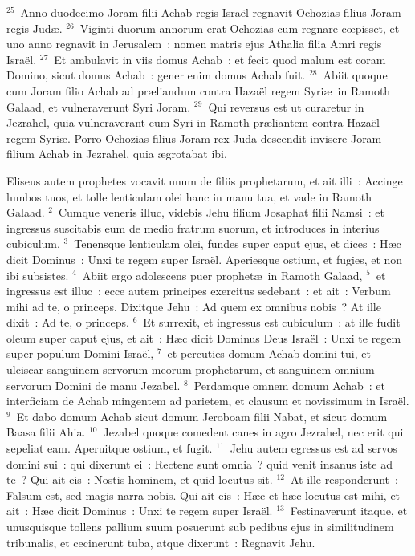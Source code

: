 ${}^{25}$~Anno duodecimo Joram filii Achab regis Isra\"el regnavit Ochozias filius Joram regis Jud\ae .
${}^{26}$~Viginti duorum annorum erat Ochozias cum regnare cœpisset, et uno anno regnavit in Jerusalem~: nomen matris ejus Athalia filia Amri regis Isra\"el.
${}^{27}$~Et ambulavit in viis domus Achab~: et fecit quod malum est coram Domino, sicut domus Achab~: gener enim domus Achab fuit.
${}^{28}$~Abiit quoque cum Joram filio Achab ad pr\ae liandum contra Haza\"el regem Syri\ae\ in Ramoth Galaad, et vulneraverunt Syri Joram.
${}^{29}$~Qui reversus est ut curaretur in Jezrahel, quia vulneraverant eum Syri in Ramoth pr\ae liantem contra Haza\"el regem Syri\ae . Porro Ochozias filius Joram rex Juda descendit invisere Joram filium Achab in Jezrahel, quia \ae grotabat ibi.

\bchapter
\lettrine[lines=3,image=true,loversize=0.05,lraise=-0.03]{E}{}liseus autem prophetes vocavit unum de filiis prophetarum, et ait illi~: Accinge lumbos tuos, et tolle lenticulam olei hanc in manu tua, et vade in Ramoth Galaad.
${}^{2}$~Cumque veneris illuc, videbis Jehu filium Josaphat filii Namsi~: et ingressus suscitabis eum de medio fratrum suorum, et introduces in interius cubiculum.
${}^{3}$~Tenensque lenticulam olei, fundes super caput ejus, et dices~: H\ae c dicit Dominus~: Unxi te regem super Isra\"el. Aperiesque ostium, et fugies, et non ibi subsistes.
${}^{4}$~Abiit ergo adolescens puer prophet\ae\ in Ramoth Galaad,
${}^{5}$~et ingressus est illuc~: ecce autem principes exercitus sedebant~: et ait~: Verbum mihi ad te, o princeps. Dixitque Jehu~: Ad quem ex omnibus nobis~? At ille dixit~: Ad te, o princeps.
${}^{6}$~Et surrexit, et ingressus est cubiculum~: at ille fudit oleum super caput ejus, et ait~: H\ae c dicit Dominus Deus Isra\"el~: Unxi te regem super populum Domini Isra\"el,
${}^{7}$~et percuties domum Achab domini tui, et ulciscar sanguinem servorum meorum prophetarum, et sanguinem omnium servorum Domini de manu Jezabel.
${}^{8}$~Perdamque omnem domum Achab~: et interficiam de Achab mingentem ad parietem, et clausum et novissimum in Isra\"el.
${}^{9}$~Et dabo domum Achab sicut domum Jeroboam filii Nabat, et sicut domum Baasa filii Ahia.
${}^{10}$~Jezabel quoque comedent canes in agro Jezrahel, nec erit qui sepeliat eam. Aperuitque ostium, et fugit.
${}^{11}$~Jehu autem egressus est ad servos domini sui~: qui dixerunt ei~: Rectene sunt omnia~? quid venit insanus iste ad te~? Qui ait eis~: Nostis hominem, et quid locutus sit.
${}^{12}$~At ille responderunt~: Falsum est, sed magis narra nobis. Qui ait eis~: H\ae c et h\ae c locutus est mihi, et ait~: H\ae c dicit Dominus~: Unxi te regem super Isra\"el.
${}^{13}$~Festinaverunt itaque, et unusquisque tollens pallium suum posuerunt sub pedibus ejus in similitudinem tribunalis, et cecinerunt tuba, atque dixerunt~: Regnavit Jehu.


